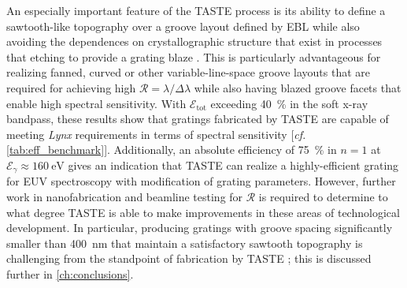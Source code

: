 An especially important feature of the TASTE process is its ability to define a sawtooth-like topography over a groove layout defined by EBL while also avoiding the dependences on crystallographic structure that exist in processes that  etching to provide a grating blaze \cite{Franke97,Chang03,McEntaffer13,Miles18}. 
This is particularly advantageous for realizing fanned, curved or other variable-line-space groove layouts that are required for achieving high $\mathscr{R} = \lambda / \Delta \lambda$ while also having blazed groove facets that enable high spectral sensitivity. %
With $\mathscr{E}_{\text{tot}}$ exceeding \SI{40}{\percent} in the soft x-ray bandpass, these results show that gratings fabricated by TASTE are capable of meeting \emph{Lynx} requirements in terms of spectral sensitivity [\emph{cf.\@} \cref{tab:eff_benchmark}]. 
Additionally, an absolute efficiency of \SI{75}{\percent} in $n=1$ at $\mathcal{E}_{\gamma} \approx \SI{160}{\electronvolt}$ gives an indication that TASTE can realize a highly-efficient grating for EUV spectroscopy with modification of grating parameters. 
However, further work in nanofabrication and beamline testing for $\mathscr{R}$ is required to determine to what degree TASTE is able to make improvements in these areas of technological development. 
In particular, producing gratings with groove spacing significantly smaller than \SI{400}{\nm} that maintain a satisfactory sawtooth topography is challenging from the standpoint of fabrication by TASTE \cite{McCurdy20}; this is discussed further in \cref{ch:conclusions}. 